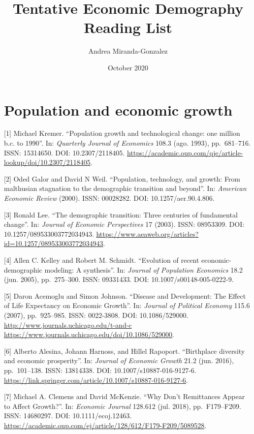 \documentclass[
  12pt,
]{article}
\title{Tentative Economic Demography Reading List}
\author{Andrea Miranda-Gonzalez}
\date{October 2020}
\begin{document}
\maketitle

{
\setcounter{tocdepth}{2}
\tableofcontents
}
\hypertarget{population-and-economic-growth}{%
\section{\texorpdfstring{\textbf{Population and economic
growth}}{Population and economic growth}}\label{population-and-economic-growth}}

{[}1{]} Michael Kremer. ``Population growth and technological change:
one million b.c. to 1990''. In: \emph{Quarterly Journal of Economics}
108.3 (ago. 1993), pp.~681--716. ISSN: 15314650. DOI: 10.2307/2118405.
\url{https://academic.oup.com/qje/article-lookup/doi/10.2307/2118405}.

{[}2{]} Oded Galor and David N Weil. ``Population, technology, and
growth: From malthusian stagnation to the demographic transition and
beyond''. In: \emph{American Economic Review} (2000). ISSN: 00028282.
DOI: 10.1257/aer.90.4.806.

{[}3{]} Ronald Lee. ``The demographic transition: Three centuries of
fundamental change''. In: \emph{Journal of Economic Perspectives} 17
(2003). ISSN: 08953309. DOI: 10.1257/089533003772034943.
\url{https://www.aeaweb.org/articles?id=10.1257/089533003772034943}.

{[}4{]} Allen C. Kelley and Robert M. Schmidt. ``Evolution of recent
economic-demographic modeling: A synthesis''. In:
\emph{Journal of Population Economics} 18.2 (jun. 2005), pp.~275--300.
ISSN: 09331433. DOI: 10.1007/s00148-005-0222-9.

{[}5{]} Daron Acemoglu and Simon Johnson. ``Disease and Development: The
Effect of Life Expectancy on Economic Growth''. In:
\emph{Journal of Political Economy} 115.6 (2007), pp.~925--985. ISSN:
0022-3808. DOI: 10.1086/529000.
\url{http://www.journals.uchicago.edu/t-and-c https://www.journals.uchicago.edu/doi/10.1086/529000}.

{[}6{]} Alberto Alesina, Johann Harnoss, and Hillel Rapoport.
``Birthplace diversity and economic prosperity''. In:
\emph{Journal of Economic Growth} 21.2 (jun. 2016), pp.~101--138. ISSN:
13814338. DOI: 10.1007/s10887-016-9127-6.
\url{https://link.springer.com/article/10.1007/s10887-016-9127-6}.

{[}7{]} Michael A. Clemens and David McKenzie. ``Why Don't Remittances
Appear to Affect Growth?''. In: \emph{Economic Journal} 128.612 (jul.
2018), pp.~F179--F209. ISSN: 14680297. DOI: 10.1111/ecoj.12463.
\url{https://academic.oup.com/ej/article/128/612/F179-F209/5089528}.
\end{document}

